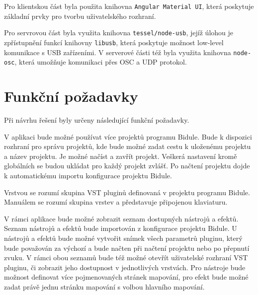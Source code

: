 \documentclass[thesis=M,czech]{FITthesis}[2019/03/06]
\begin{document}
	Pro klientskou část byla použita knihovna \texttt{Angular Material UI}, která poskytuje základní prvky pro tvorbu uživatelského rozhraní.
	
	Pro servrovou část byla využita knihovna \texttt{tessel/node-usb}, jejíž úlohou je zpřístupnění funkcí knihovny \texttt{libusb}, která poskytuje možnost low-level komunikace s USB zařízeními\cite{libusb}.
	V serverové části též byla využita knihovna \texttt{node-osc}, která umožňuje komunikaci přes OSC a UDP protokol.
	
	\section{Funkční požadavky}
	Při návrhu řešení byly určeny následující funkční požadavky.
	
	V aplikaci bude možné používat více projektů programu Bidule. Bude k dispozici rozhraní pro správu projektů, kde bude možné
	zadat cestu k uloženému projektu a název projektu. Je možné načíst a zavřít projekt. Veškerá nastavení kromě globálních se budou ukládat 
	pro každý projekt zvlášť. Po načtení projektu dojde k automatickému importu konfigurace projektu Bidule.
	
	Vrstvou se rozumí skupina VST pluginů definovaná v projektu programu Bidule. Manuálem se rozumí skupina vrstev a představuje připojenou klaviaturu.
	
	V rámci aplikace bude možné zobrazit seznam dostupných nástrojů a efektů. Seznam nástrojů a efektů bude importován z konfigurace projektu Bidule.
	U nástrojů a efektů bude možné vytvořit snímek všech parametrů pluginu, který bude považován za výchozí a bude načten při načtení projektu nebo po přepnutí zvuku. V rámci obou seznamů bude též možné otevřít uživatelské rozhraní VST pluginu, či zobrazit jeho dostupnost v jednotlivých vrstvách. Pro nástroje bude možnost definovat více pojmenovaných stránek mapování, pro efekt bude možné zadat právě jednu stránku mapování s volbou hlavního mapování.
	
\end{document}
